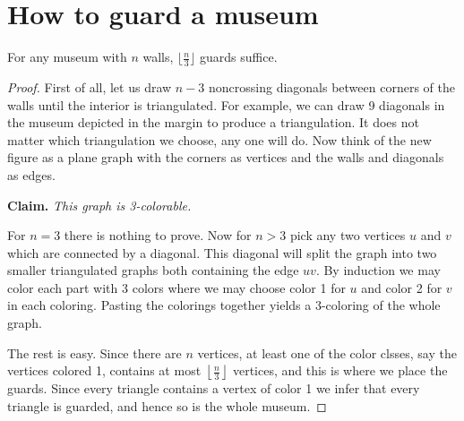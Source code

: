\chapter{How to guard a museum}

\begin{theorem}
  \label{museum_guards}
  For any museum with $n$ walls, $\lfloor \frac{n}{3} \rfloor$ guards suffice.
\end{theorem}
\begin{proof}
  First of all, let us draw $n - 3$ noncrossing diagonals between corners of the walls until the
  interior is triangulated. For example, we can draw 9 diagonals in the museum depicted in the
  margin to produce a triangulation. It does not matter which triangulation we choose, any one
  will do. Now think of the new figure as a plane graph with the corners as vertices and the
   walls and diagonals as edges.

\textbf{Claim.} \textit{This graph is 3-colorable.}

For $n = 3$ there is nothing to prove. Now for $n > 3$ pick any two vertices $u$ and $v$ which are
connected by a diagonal. This diagonal will split the graph into two smaller triangulated graphs
both containing the edge $uv$. By induction we may color each part with 3 colors where we may
choose color 1 for $u$ and color 2 for $v$ in each coloring. Pasting the colorings together
yields a 3-coloring of the whole graph.

The rest is easy. Since there are $n$ vertices, at least one of the color clsses, say the
 vertices colored 1, contains at most $\left\lfloor \frac{n}{3} \right\rfloor$ vertices, and
  this is where we place the guards. Since every triangle contains a vertex of color 1 we infer
  that every triangle is guarded, and hence so is the whole museum.

\end{proof}
